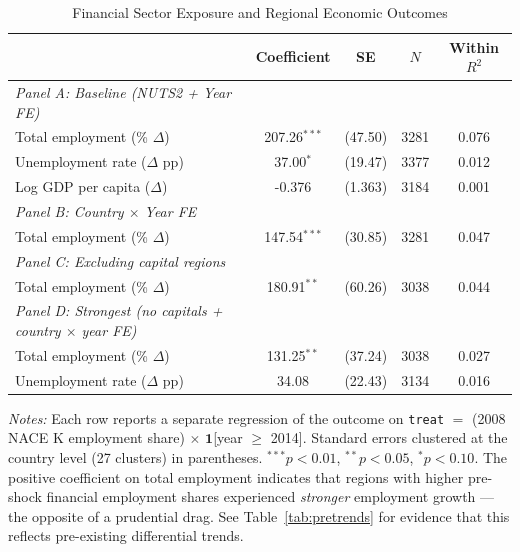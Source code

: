 \begin{table}[t]
\centering
\caption{Financial Sector Exposure and Regional Economic Outcomes}
\label{tab:main}
\begin{threeparttable}
\small\begin{tabular}{lcccc}
\toprule
 & Coefficient & SE & $N$ & Within $R^2$ \\
\midrule
\emph{Panel A: Baseline (NUTS2 + Year FE)} \\
\addlinespace
Total employment (\% $\Delta$) & 207.26$^{***}$ & (47.50) & 3281 & 0.076 \\
Unemployment rate ($\Delta$ pp) & 37.00$^{*}$ & (19.47) & 3377 & 0.012 \\
Log GDP per capita ($\Delta$) & -0.376 & (1.363) & 3184 & 0.001 \\
\addlinespace
\emph{Panel B: Country $\times$ Year FE} \\
\addlinespace
Total employment (\% $\Delta$) & 147.54$^{***}$ & (30.85) & 3281 & 0.047 \\
\addlinespace
\emph{Panel C: Excluding capital regions} \\
\addlinespace
Total employment (\% $\Delta$) & 180.91$^{**}$ & (60.26) & 3038 & 0.044 \\
\addlinespace
\emph{Panel D: Strongest (no capitals + country $\times$ year FE)} \\
\addlinespace
Total employment (\% $\Delta$) & 131.25$^{**}$ & (37.24) & 3038 & 0.027 \\
Unemployment rate ($\Delta$ pp) & 34.08 & (22.43) & 3134 & 0.016 \\
\bottomrule
\end{tabular}
\begin{tablenotes}[flushleft]\footnotesize\raggedright
\item \textit{Notes:} Each row reports a separate regression of the outcome on \texttt{treat} $=$ (2008 NACE K employment share) $\times$ $\mathbf{1}$[year $\geq$ 2014]. Standard errors clustered at the country level (27 clusters) in parentheses. $^{***}p<0.01$, $^{**}p<0.05$, $^{*}p<0.10$. The positive coefficient on total employment indicates that regions with higher pre-shock financial employment shares experienced \emph{stronger} employment growth --- the opposite of a prudential drag. See Table~\ref{tab:pretrends} for evidence that this reflects pre-existing differential trends.
\end{tablenotes}
\end{threeparttable}
\end{table}

